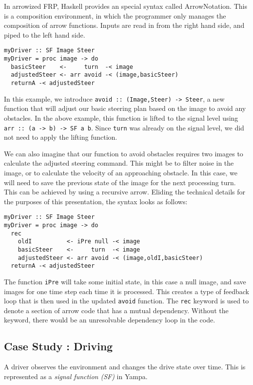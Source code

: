 In arrowized FRP, Haskell provides an special syntax called ArrowNotation.
This is a composition environment, in which the programmer only manages the composition of arrow functions.
Inputs are read in from the right hand side, and piped to the left hand side.

\begin{lstlisting}
myDriver :: SF Image Steer
myDriver = proc image -> do
  basicSteer    <-     turn  -< image
  adjustedSteer <- arr avoid -< (image,basicSteer)
  returnA -< adjustedSteer
\end{lstlisting}

In this example, we introduce \texttt{avoid :: (Image,Steer) -> Steer}, a new function that will adjust our basic steering plan based on the image to avoid any obstacles.
In the above example, this function is lifted to the signal level using \texttt{arr :: (a -> b) -> SF a b}.
Since \texttt{turn} was already on the signal level, we did not need to apply the lifting function.

We can also imagine that our function to avoid obstacles requires two images to calculate the adjusted steering command.
This might be to filter noise in the image, or to calculate the velocity of an approaching obstacle.
In this case, we will need to save the previous state of the image for the next processing turn.
This can be achieved by using a recursive arrow. 
Eliding the technical details for the purposes of this presentation, the syntax looks as follows:

\begin{lstlisting}
myDriver :: SF Image Steer
myDriver = proc image -> do
  rec
    oldI          <- iPre null -< image
    basicSteer    <-     turn  -< image
    adjustedSteer <- arr avoid -< (image,oldI,basicSteer)
  returnA -< adjustedSteer
\end{lstlisting}

The function \texttt{iPre} will take some initial state, in this case a null image, and save images for one time step each time it is processed.
This creates a type of feedback loop that is then used in the updated \texttt{avoid} function.
The \texttt{rec} keyword is used to denote a section of arrow code that has a mutual dependency.
Without the keyword, there would be an unresolvable dependency loop in the code.

\subsection{Case Study : Driving}
A driver observes the environment and changes the drive state over time.
This is represented as a \textit{signal function (SF)} in Yampa.

